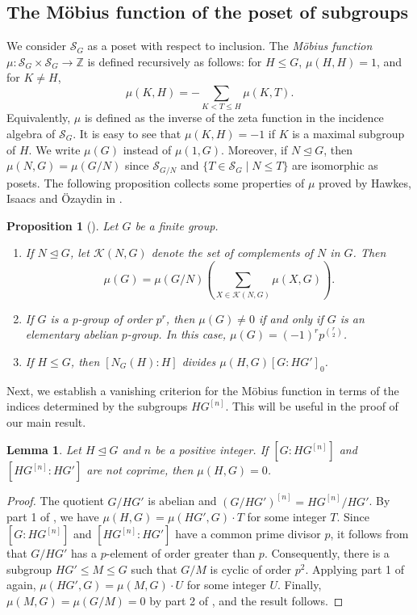 \documentclass[letterpaper,12pt]{article}
\theoremstyle{plain}
\newtheorem{lemma}[theorem]{Lemma}
\newtheorem{prop}[theorem]{Proposition}
\theoremstyle{definition}
\newcommand{\Z}{\mathbb{Z}}
\newcommand{\SG}{\mathcal{S}_G}
\begin{document}
\subsection{The Möbius function of the poset of subgroups}

We consider $\SG$ as a poset with respect to inclusion. The \textit{Möbius function} $\mu:\SG\times \SG\longrightarrow \Z$ is defined recursively as follows: for $H\leq G$, $\mu(H,H)=1$, and for $K\neq H$,
\[\mu(K,H)=-\sum_{K< T\leq H}\mu(K,T).\]
Equivalently, $\mu$ is defined as the inverse of the zeta function in the incidence algebra of $\SG$. It is easy to see that $\mu(K,H)=-1$ if $K$ is a maximal subgroup of $H$. We write $\mu(G)$ instead of $\mu(1,G)$. Moreover, if $N\unlhd G$, then $\mu(N,G)=\mu(G/N)$ since $\mathcal{S}_{G/N}$ and $\{T\in \SG \mid N\leq T\}$ are isomorphic as posets. The following proposition collects some properties of $\mu$ proved by Hawkes, Isaacs and Özaydin in \cite{HaIsOz}.

\begin{prop}[\cite{HaIsOz}] 
    Let $G$ be a finite group.
    \begin{enumerate}
        \item If $N\unlhd G$, let $\mathcal{K}(N,G)$ denote the set of complements of $N$ in $G$. Then
        $$\mu(G)=\mu(G/N)\left(\sum_{X\in \mathcal{K}(N,G)}\mu(X,G)\right).$$
        \item If $G$ is a $p$-group of order $p^r$, then $\mu(G)\neq 0$ if and only if $G$ is an elementary abelian $p$-group. In this case, $\mu(G)=(-1)^rp^{\binom{r}{2}}$.
        \item If $H\leq G$, then $[N_G(H):H]$ divides $\mu(H,G)[G:HG']_0$.
    \end{enumerate}
\end{prop}

Next, we establish a vanishing criterion for the Möbius function in terms of the indices determined by the subgroups $HG^{[n]}$. This will be useful in the proof of our main result.

\begin{lemma}
    Let $H\unlhd G$ and $n$ be a positive integer. If $\left[G:HG^{[n]}\right]$ and $\left[HG^{[n]}:HG'\right]$ are not coprime, then $\mu(H,G)=0$.
\end{lemma}
\begin{proof}
    The quotient $G/HG'$ is abelian and $\left(G/HG'\right)^{[n]}=HG^{[n]}/HG'$. By part 1 of , we have $\mu(H,G)=\mu(HG',G)\cdot T$ for some integer $T$. Since $\left[G:HG^{[n]}\right]$ and $\left[HG^{[n]}:HG'\right]$ have a common prime divisor $p$, it follows from  that $G/HG'$ has a $p$-element of order greater than $p$. Consequently, there is a subgroup $HG'\leq M\leq G$ such that $G/M$ is cyclic of order $p^2$. Applying part 1 of  again, $\mu(HG',G)=\mu(M,G)\cdot U$ for some integer $U$. Finally, $\mu(M,G)=\mu(G/M)=0$ by part 2 of , and the result follows.
\end{proof}
\end{document}
